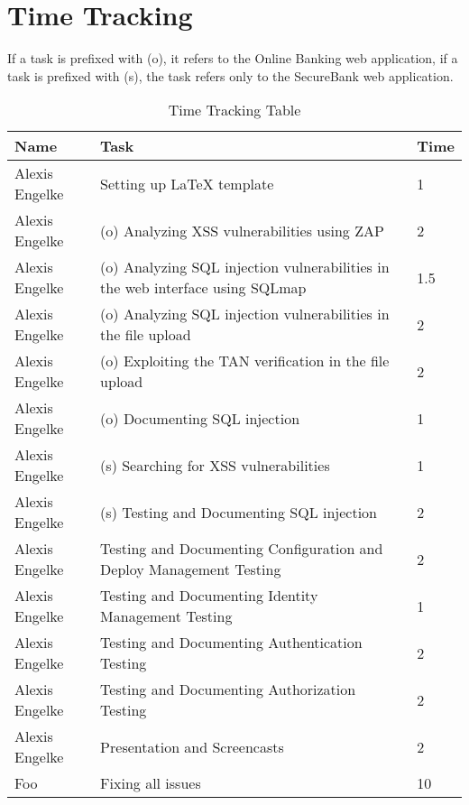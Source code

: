\chapter{Time Tracking}\label{chapter:times}

If a task is prefixed with (o), it refers to the Online Banking web application, if a task is prefixed with (s), the task refers only to the SecureBank web application.

\begin{table}[htpb]
  \caption[Time Tracking Table]{Time Tracking Table}\label{tab:times}
  \centering
  \begin{tabular}{l p{8cm} l}
    \toprule
      Name & Task & Time \\
    \midrule
      Alexis Engelke & Setting up LaTeX template & 1 \\
      Alexis Engelke & (o) Analyzing XSS vulnerabilities using ZAP & 2 \\
      Alexis Engelke & (o) Analyzing SQL injection vulnerabilities in the web interface using SQLmap & 1.5 \\
      Alexis Engelke & (o) Analyzing SQL injection vulnerabilities in the file upload & 2 \\
      Alexis Engelke & (o) Exploiting the TAN verification in the file upload & 2 \\
      Alexis Engelke & (o) Documenting SQL injection & 1 \\
      Alexis Engelke & (s) Searching for XSS vulnerabilities & 1 \\
      Alexis Engelke & (s) Testing and Documenting SQL injection & 2 \\
      Alexis Engelke & Testing and Documenting Configuration and Deploy Management Testing & 2 \\
      Alexis Engelke & Testing and Documenting Identity Management Testing & 1 \\
      Alexis Engelke & Testing and Documenting Authentication Testing & 2 \\
      Alexis Engelke & Testing and Documenting Authorization Testing & 2 \\
      Alexis Engelke & Presentation and Screencasts & 2 \\
      Foo & Fixing all issues & 10 \\
    \bottomrule
  \end{tabular}
\end{table}
